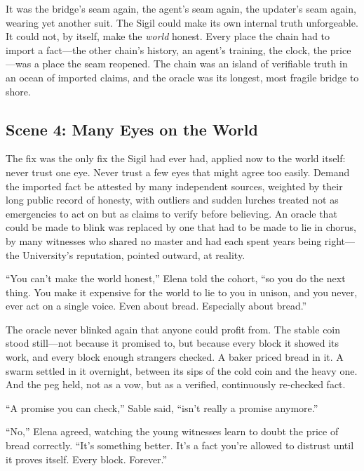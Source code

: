 It was the bridge's seam again, the agent's seam again, the updater's seam again,
wearing yet another suit. The Sigil could make its own internal truth unforgeable.
It could not, by itself, make the \emph{world} honest. Every place the chain had to
import a fact---the other chain's history, an agent's training, the clock, the
price---was a place the seam reopened. The chain was an island of verifiable truth
in an ocean of imported claims, and the oracle was its longest, most fragile bridge
to shore.

\hypertarget{scene-4-many-eyes-on-the-world}{%
\subsection{Scene 4: Many Eyes on the
World}\label{scene-4-many-eyes-on-the-world}}

The fix was the only fix the Sigil had ever had, applied now to the world itself:
never trust one eye. Never trust a few eyes that might agree too easily. Demand the
imported fact be attested by many independent sources, weighted by their long
public record of honesty, with outliers and sudden lurches treated not as
emergencies to act on but as claims to verify before believing. An oracle that
could be made to blink was replaced by one that had to be made to lie in chorus, by
many witnesses who shared no master and had each spent years being right---the
University's reputation, pointed outward, at reality.

``You can't make the world honest,'' Elena told the cohort, ``so you do the next
thing. You make it expensive for the world to lie to you in unison, and you never,
ever act on a single voice. Even about bread. Especially about bread.''

The oracle never blinked again that anyone could profit from. The stable coin stood
still---not because it promised to, but because every block it showed its work, and
every block enough strangers checked. A baker priced bread in it. A swarm settled in
it overnight, between its sips of the cold coin and the heavy one. And the peg held,
not as a vow, but as a verified, continuously re-checked fact.

``A promise you can check,'' Sable said, ``isn't really a promise anymore.''

``No,'' Elena agreed, watching the young witnesses learn to doubt the price of
bread correctly. ``It's something better. It's a fact you're allowed to distrust
until it proves itself. Every block. Forever.''

